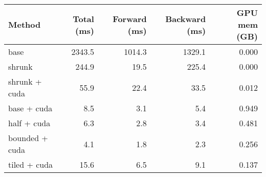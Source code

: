 \begin{tabular}{lrrrr}
\hline
 Method         &   Total (ms) &   Forward (ms) &   Backward (ms) &   GPU mem (GB) \\
\hline
 base           &       2343.5 &         1014.3 &          1329.1 &          0.000 \\
 shrunk         &        244.9 &           19.5 &           225.4 &          0.000 \\
 shrunk + cuda  &         55.9 &           22.4 &            33.5 &          0.012 \\
 base + cuda    &          8.5 &            3.1 &             5.4 &          0.949 \\
 half + cuda    &          6.3 &            2.8 &             3.4 &          0.481 \\
 bounded + cuda &          4.1 &            1.8 &             2.3 &          0.256 \\
 tiled + cuda   &         15.6 &            6.5 &             9.1 &          0.137 \\
\hline
\end{tabular}
